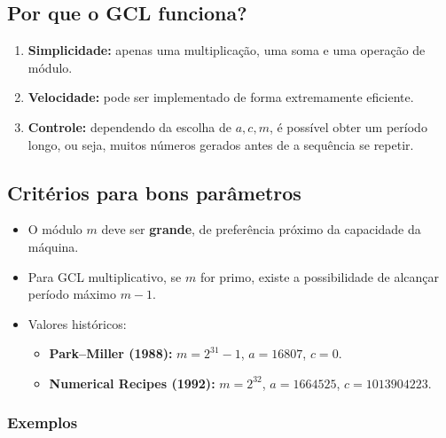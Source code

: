 \documentclass[
  letterpaper,
  DIV=11,
  numbers=noendperiod]{scrreprt}
\providecommand{\tightlist}{%
  \setlength{\itemsep}{0pt}\setlength{\parskip}{0pt}}\usepackage{longtable,booktabs,array}
\begin{document}
\subsection*{Por que o GCL funciona?}\label{por-que-o-gcl-funciona}

\begin{enumerate}
\def\labelenumi{\arabic{enumi}.}
\tightlist
\item
  \textbf{Simplicidade:} apenas uma multiplicação, uma soma e uma
  operação de módulo.\\
\item
  \textbf{Velocidade:} pode ser implementado de forma extremamente
  eficiente.\\
\item
  \textbf{Controle:} dependendo da escolha de \(a, c, m\), é possível
  obter um período longo, ou seja, muitos números gerados antes de a
  sequência se repetir.
\end{enumerate}

\subsection*{Critérios para bons
parâmetros}\label{crituxe9rios-para-bons-paruxe2metros}

\begin{itemize}
\tightlist
\item
  O módulo \(m\) deve ser \textbf{grande}, de preferência próximo da
  capacidade da máquina.\\
\item
  Para GCL multiplicativo, se \(m\) for primo, existe a possibilidade de
  alcançar período máximo \(m-1\).\\
\item
  Valores históricos:

  \begin{itemize}
  \tightlist
  \item
    \textbf{Park--Miller (1988):} \(m = 2^{31} - 1\), \(a = 16807\),
    \(c = 0\).\\
  \item
    \textbf{Numerical Recipes (1992):} \(m = 2^{32}\), \(a = 1664525\),
    \(c = 1013904223\).
  \end{itemize}
\end{itemize}

\subsubsection*{Exemplos}\label{exemplos}
\end{document}
